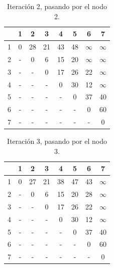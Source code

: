 \documentclass[letterpaper,10pt]{article}
\begin{document}
\begin{enumerate}
        \begin{minipage}[t]{0.47\textwidth}
            \begin{table}[H]
                \centering
            \begin{tabular}{|c|c|c|c|c|c|c|c|}\hline
                   & 1 & 2 & 3 & 4 & 5 & 6 & 7   \\ \hline
                 1 & $0$ & 28 & 21 & 43 & 48 & $\infty$ & $\infty$      \\\hline
                 2 & -  & 0  & 6  & 15  & 20  & $\infty$  & $\infty$   \\\hline
                 3 & -  & -  & 0  & 17  & 26  & 22  & $\infty$   \\\hline
                 4 & -  & -  & -  & 0  & 30  & 12  & $\infty$   \\\hline
                 5 & -  & -  & -  & -  & 0  & 37  & 40  \\\hline
                 6 & -  & -  & -  & -  & -  & 0  & 60   \\\hline
                 7 & -  & -  & -  & -  & -  & -  & 0   \\\hline
                \end{tabular}
                \caption{Iteración 2, pasando por el nodo 2.}
                \label{tablitafloyd2}
            \end{table}
        \end{minipage}
        \begin{minipage}[t]{0.47\textwidth}
            \begin{table}[H]
                \centering
            \begin{tabular}{|c|c|c|c|c|c|c|c|}\hline
                   & 1 & 2 & 3 & 4 & 5 & 6 & 7   \\ \hline
                 1 & $0$ & 27 & 21 & 38 & 47 & 43 & $\infty$      \\\hline
                 2 & -  & 0  & 6  & 15  & 20  & 28  & $\infty$   \\\hline
                 3 & -  & -  & 0  & 17  & 26  & 22  & $\infty$   \\\hline
                 4 & -  & -  & -  & 0  & 30  & 12  & $\infty$   \\\hline
                 5 & -  & -  & -  & -  & 0  & 37  & 40  \\\hline
                 6 & -  & -  & -  & -  & -  & 0  & 60   \\\hline
                 7 & -  & -  & -  & -  & -  & -  & 0   \\\hline
                \end{tabular}
                \caption{Iteración 3, pasando por el nodo 3.}
                \label{tablitafloyd3}
            \end{table}
        \end{minipage}


\end{enumerate}
\end{document}
